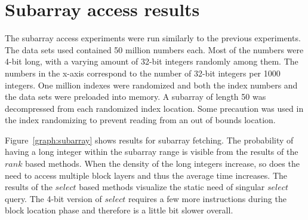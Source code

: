 \section{Subarray access results}

The subarray access experiments were run similarly to the previous experiments. The data sets used contained 50 million numbers each. Most of the numbers were 4-bit long, with a varying amount of 32-bit 
integers randomly among them. The numbers in the x-axis correspond to the number of 32-bit integers per 1000 integers. One million indexes were randomized and both the index numbers and the data sets were 
preloaded into memory. A subarray of length 50 was decompressed from each randomized index location. Some precaution was used in the index randomizing to prevent reading from an out of bounds location.

Figure~\ref{graph:subarray} shows results for subarray fetching. The probability of having a long integer within the subarray range is visible from the results of the $rank$ based methods. When the density of the long integers increase, so does the need to access multiple 
block layers and thus the average time increases. The results of the $select$ based methods visualize the static need of singular $select$ query. The 4-bit version of $select$ requires a few more instructions 
during the block location phase and therefore is a little bit slower overall.


